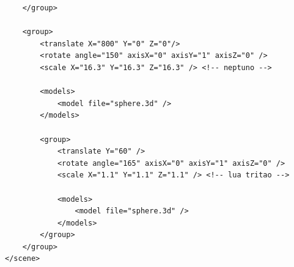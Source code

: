 \documentclass{report}
\begin{document}
\begin{lstlisting}
    </group>

    <group>
        <translate X="800" Y="0" Z="0"/> 
        <rotate angle="150" axisX="0" axisY="1" axisZ="0" />
        <scale X="16.3" Y="16.3" Z="16.3" /> <!-- neptuno -->

        <models>
            <model file="sphere.3d" />
        </models>

        <group>
            <translate Y="60" /> 
            <rotate angle="165" axisX="0" axisY="1" axisZ="0" />
            <scale X="1.1" Y="1.1" Z="1.1" /> <!-- lua tritao -->

            <models>
                <model file="sphere.3d" />
            </models>
        </group>
    </group>
</scene>


\end{lstlisting}
\end{document}
